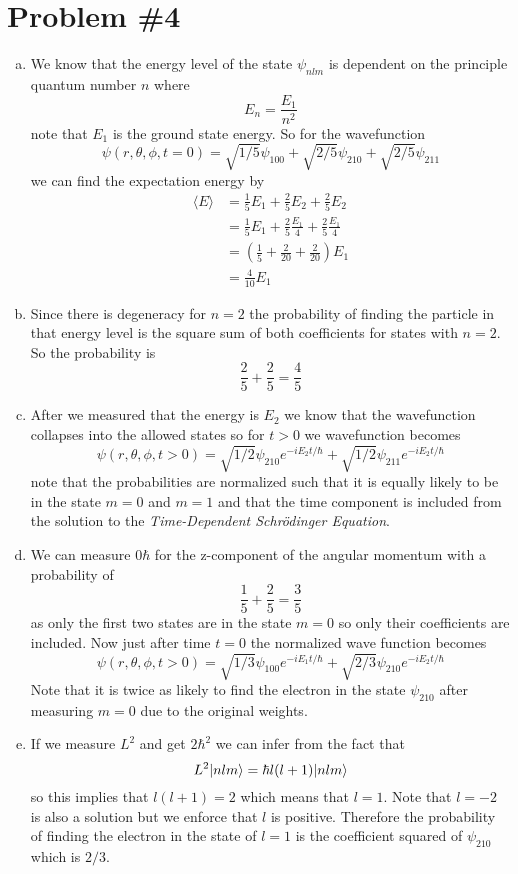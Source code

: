 \documentclass[11pt]{article}
\numberwithin{equation}{section}
\begin{document}
\section{Problem \#4}
\begin{enumerate}[(a)]
\item
We know that the energy level of the state $\psi_{nlm}$ is dependent on the principle quantum number $n$ where
$$E_n = \frac{E_1}{n^2}$$
note that $E_1$ is the ground state energy. So for the wavefunction
$$\psi(r,\theta,\phi,t=0) = \sqrt{1/5}\psi_{100} + \sqrt{2/5}\psi_{210} + \sqrt{2/5}\psi_{211}$$
we can find the expectation energy by
\begin{align*}
\langle E\rangle &= \frac{1}{5}E_1 + \frac{2}{5}E_2 + \frac{2}{5}E_2 \\
&= \frac{1}{5}E_1 + \frac{2}{5}\frac{E_1}{4} + \frac{2}{5}\frac{E_1}{4} \\
&= \left(\frac{1}{5} + \frac{2}{20}+ \frac{2}{20}\right)E_1\\
&= \frac{4}{10}E_1
\end{align*}

\item
Since there is degeneracy for $n=2$ the probability of finding the particle in that energy level is the square sum of both coefficients for states with $n=2$. So the probability is
$$\frac{2}{5} + \frac{2}{5} = \frac{4}{5}$$

\item
After we measured that the energy is $E_2$ we know that the wavefunction collapses into the allowed states so for $t>0$ we wavefunction becomes
$$\psi(r,\theta,\phi,t>0) = \sqrt{1/2}\psi_{210}e^{-iE_2t/\hbar} + \sqrt{1/2}\psi_{211}e^{-iE_2t/\hbar}$$
note that the probabilities are normalized such that it is equally likely to be in the state $m=0$ and $m=1$ and that the time component is included from the solution to the \emph{Time-Dependent Schr\"{o}dinger Equation}.

\item
We can measure $0\hbar$ for the z-component of the angular momentum with a probability of 
$$\frac{1}{5} + \frac{2}{5} = \frac{3}{5}$$
as only the first two states are in the state $m=0$ so only their coefficients are included. Now just after time $t=0$ the normalized wave function becomes
$$\psi(r,\theta,\phi,t>0) = \sqrt{1/3}\psi_{100}e^{-iE_1t/\hbar} + \sqrt{2/3}\psi_{210}e^{-iE_2t/\hbar}$$
Note that it is twice as likely to find the electron in the state $\psi_{210}$ after measuring $m=0$ due to the original weights.

\item
If we measure $L^2$ and get $2\hbar^2$ we can infer from the fact that
$$L^2|{nlm}\rangle = \hbar l(l+1)|{nlm}\rangle$$
so this implies that $l(l+1) = 2$ which means that $l = 1$. Note that $l=-2$ is also a solution but we enforce that $l$ is positive. Therefore the probability of finding the electron in the state of $l=1$ is the coefficient squared of $\psi_{210}$ which is $2/3$.
\end{enumerate}
\end{document}
